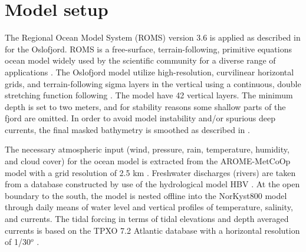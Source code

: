 \section{Model setup}
\label{sec:model_setup}

The Regional Ocean Model System (ROMS) version 3.6 is applied as described in \cite{roed16} for the Oslofjord. ROMS is a free-surface, terrain-following, primitive equations ocean model widely used by the scientific community for a diverse range of applications \cite[]{shchepetkin05,shchepetkin09,haidvogel08}. 
The Oslofjord model utilize high-resolution, curvilinear horizontal grids, and terrain-following sigma layers in the vertical using a continuous, double stretching function following \cite{shchepetkin09}. The model have 42 vertical layers. The minimum depth is set to two meters, and for stability reasons some shallow parts of the fjord are omitted. In order to avoid model instability and/or spurious deep currents, the final masked bathymetry is smoothed as described in \cite{roed16}.



The necessary atmospheric input (wind, pressure, rain, temperature, humidity, and cloud cover) for the ocean model is extracted from the AROME-MetCoOp model with a grid resolution of 2.5 km \cite[]{muller2015}. Freshwater discharges (rivers) are taken from a database constructed by use of the hydrological model HBV \cite[]{beldring2003}. At the open boundary to the south, the model is nested offline into the NorKyst800 model \cite[]{albretsen11} through daily means of water level and vertical profiles of temperature, salinity, and currents.  
The tidal forcing in terms of tidal elevations and depth averaged currents is based on the TPXO 7.2 Atlantic database with a horizontal resolution of 1/30$^o$ \cite[]{egbert02}.


